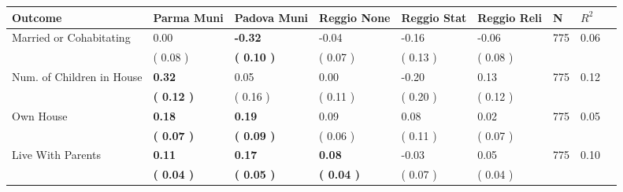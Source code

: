 \begin{tabular}{L{6.2cm} C{1.8cm} C{1.8cm} C{1.8cm} C{1.8cm} C{1.8cm} C{1.8cm} C{0.3cm} C{0.3cm}}
\toprule
 \textbf{Outcome} & \textbf{Parma Muni} & \textbf{Padova Muni} & \textbf{Reggio None} & \textbf{Reggio Stat} & \textbf{Reggio Reli} & \textbf{N} & \textbf{$ R^2$} \\
\midrule
Married or Cohabitating &      0.00 & \textbf{    -0.32} &     -0.04 &     -0.16 &     -0.06  & 775 &       0.06 \\ 
 & (     0.08 ) & \textbf{(     0.10 )} & (     0.07 ) & (     0.13 ) & (     0.08 )  & \\
Num. of Children in House & \textbf{     0.32} &      0.05 &      0.00 &     -0.20 &      0.13  & 775 &       0.12 \\ 
 & \textbf{(     0.12 )} & (     0.16 ) & (     0.11 ) & (     0.20 ) & (     0.12 )  & \\
Own House & \textbf{     0.18} & \textbf{     0.19} &      0.09 &      0.08 &      0.02  & 775 &       0.05 \\ 
 & \textbf{(     0.07 )} & \textbf{(     0.09 )} & (     0.06 ) & (     0.11 ) & (     0.07 )  & \\
Live With Parents & \textbf{     0.11} & \textbf{     0.17} & \textbf{     0.08} &     -0.03 &      0.05  & 775 &       0.10 \\ 
 & \textbf{(     0.04 )} & \textbf{(     0.05 )} & \textbf{(     0.04 )} & (     0.07 ) & (     0.04 )  & \\
\bottomrule
\end{tabular}

